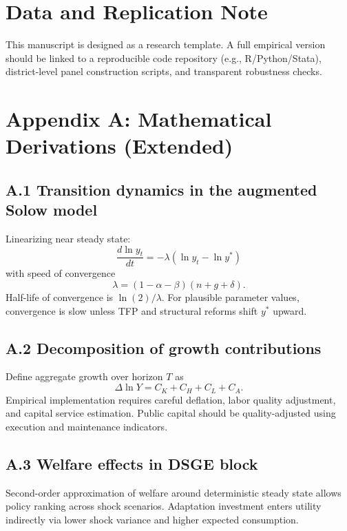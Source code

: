 \documentclass[preprint,12pt]{elsarticle}
\begin{document}
\section*{Data and Replication Note}
This manuscript is designed as a research template. A full empirical version should be linked to a reproducible code repository (e.g., R/Python/Stata), district-level panel construction scripts, and transparent robustness checks.

\appendix
\section{Appendix A: Mathematical Derivations (Extended)}
\subsection{A.1 Transition dynamics in the augmented Solow model}
Linearizing near steady state:
\begin{equation}
\frac{d\ln y_t}{dt} = -\lambda (\ln y_t - \ln y^*)
\end{equation}
with speed of convergence
\begin{equation}
\lambda = (1-\alpha-\beta)(n+g+\delta).
\end{equation}
Half-life of convergence is $\ln(2)/\lambda$. For plausible parameter values, convergence is slow unless TFP and structural reforms shift $y^*$ upward.

\subsection{A.2 Decomposition of growth contributions}
Define aggregate growth over horizon $T$ as
\begin{equation}
\Delta \ln Y = C_K + C_H + C_L + C_A.
\end{equation}
Empirical implementation requires careful deflation, labor quality adjustment, and capital service estimation. Public capital should be quality-adjusted using execution and maintenance indicators.

\subsection{A.3 Welfare effects in DSGE block}
Second-order approximation of welfare around deterministic steady state allows policy ranking across shock scenarios. Adaptation investment enters utility indirectly via lower shock variance and higher expected consumption.
\end{document}

